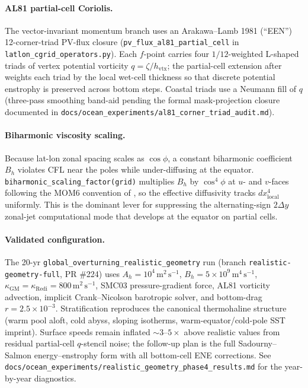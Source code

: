 \documentclass[11pt,twoside]{report}
\begin{document}
\paragraph{AL81 partial-cell Coriolis.}
The vector-invariant momentum branch uses an Arakawa--Lamb 1981
(``EEN'') 12-corner-triad PV-flux closure
(\texttt{pv\_flux\_al81\_partial\_cell} in
\texttt{latlon\_cgrid\_operators.py}).  Each $f$-point carries four
$1/12$-weighted L-shaped triads of vertex potential vorticity
$q = \zeta/h_{\mathrm{vtx}}$; the partial-cell extension after
\citet{LeSommer2009} weights each triad by the local wet-cell
thickness so that discrete potential enstrophy is preserved across
bottom steps.  Coastal triads use a Neumann fill of $q$ (three-pass
smoothing band-aid pending the formal mask-projection closure
documented in \texttt{docs/ocean\_experiments/al81\_corner\_triad\_audit.md}).

\paragraph{Biharmonic viscosity scaling.}
Because lat-lon zonal spacing scales as $\cos\phi$, a constant
biharmonic coefficient $B_h$ violates CFL near the poles while
under-diffusing at the equator.
\texttt{biharmonic\_scaling\_factor(grid)} multiplies $B_h$ by
$\cos^4\phi$ at $u$- and $v$-faces following the MOM6 convention of
\citet{GriffiesHallberg2000}, so the effective diffusivity tracks
$dx^4_{\mathrm{local}}$ uniformly.  This is the dominant lever for
suppressing the alternating-sign $2\Delta y$ zonal-jet computational
mode that develops at the equator on partial cells.

\paragraph{Validated configuration.}
The 20-yr \texttt{global\_overturning\_realistic\_geometry} run
(branch \texttt{realistic-geometry-full}, PR \#224) uses
$A_h = 10^4\,\mathrm{m^2\,s^{-1}}$,
$B_h = 5{\times}10^9\,\mathrm{m^4\,s^{-1}}$,
$\kappa_{\mathrm{GM}} = \kappa_{\mathrm{Redi}} = 800\,\mathrm{m^2\,s^{-1}}$,
SMC03 pressure-gradient force, AL81 vorticity advection, implicit
Crank--Nicolson barotropic solver, and bottom-drag $r=2.5{\times}10^{-3}$.
Stratification reproduces the canonical thermohaline structure (warm
pool aloft, cold abyss, sloping isotherms, warm-equator/cold-pole SST
imprint).  Surface speeds remain inflated ${\sim}3$--$5\times$ above
realistic values from residual partial-cell $q$-stencil noise; the
follow-up plan is the full Sadourny--Salmon energy--enstrophy form
with all bottom-cell ENE corrections.  See
\texttt{docs/ocean\_experiments/realistic\_geometry\_phase4\_results.md}
for the year-by-year diagnostics.
\end{document}
